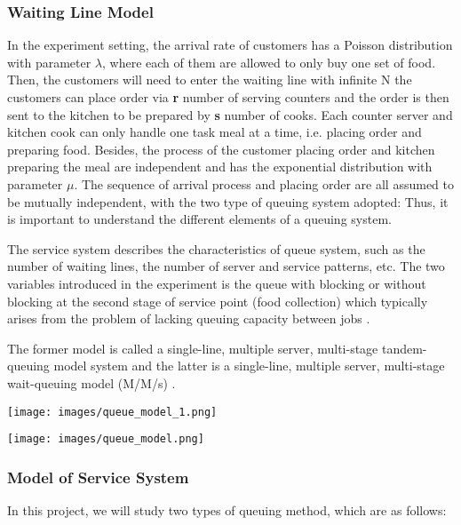 \subsubsection{Waiting Line Model}
In the experiment setting, the arrival rate of customers has a Poisson distribution with parameter $\lambda$, where each of them are allowed to only buy one set of food. Then, the customers will need to enter the waiting line with infinite N the customers can place order via \textbf{r} number of serving counters and the order is then sent to the kitchen to be prepared by \textbf{s} number of cooks. Each counter server and kitchen cook can only handle one task meal at a time, i.e. placing order and preparing food. Besides, the process of the customer placing order and kitchen preparing the meal are independent and has the exponential distribution with parameter $\mu$. The sequence of arrival process and placing order are all assumed to be mutually independent, with the two type of queuing system adopted: Thus, it is important to understand the different elements of a queuing system.

The service system describes the characteristics of queue system, such as the number of waiting lines, the number of server and service patterns, etc. The two variables introduced in the experiment is the queue with blocking or without blocking at the second stage of service point (food collection) which typically arises from the problem of lacking queuing capacity between jobs \cite{Gomez-Corral2002}.
 
The former model is called a single-line, multiple server, multi-stage tandem-queuing model system \cite{ross2014introduction} and the latter is a single-line, multiple server, multi-stage wait-queuing model (M/M/s) \cite{WU2019927}.

\noindent
\begin{minipage}{\textwidth}
    \texttt{[image: images/queue\_model\_1.png]}
    \label{fig:single-phase}
\end{minipage}
\begin{minipage}{\textwidth}
    \texttt{[image: images/queue\_model.png]}
    \label{fig:multi-phase}
\end{minipage}
\subsubsection{Model of Service System}
In this project, we will study two types of queuing method, which are as follows:

